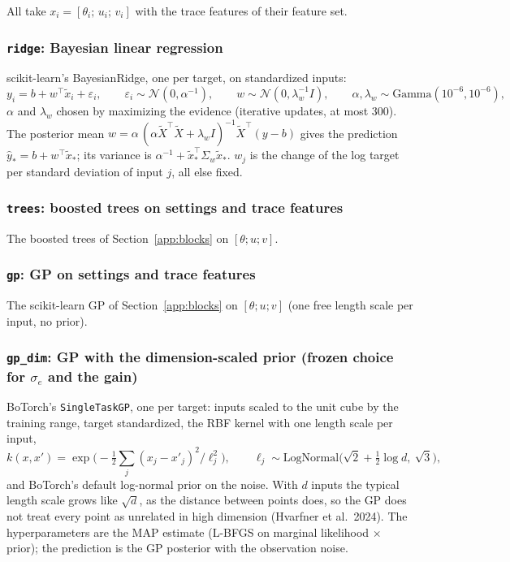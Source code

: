 All take $x_i=[\theta_i;\,u_i;\,v_i]$ with the trace features of their feature set.

\subsubsection{\texttt{ridge}: Bayesian linear regression}
scikit-learn's BayesianRidge, one per target, on standardized inputs:
\[
y_i=b+w^\top\tilde x_i+\varepsilon_i,\qquad \varepsilon_i\sim\mathcal N(0,\alpha^{-1}),\qquad w\sim\mathcal N(0,\lambda_w^{-1}I),
\qquad \alpha,\lambda_w\sim\text{Gamma}(10^{-6},10^{-6}),
\]
$\alpha$ and $\lambda_w$ chosen by maximizing the evidence (iterative updates, at most 300). The posterior mean
$w=\alpha\,(\alpha\tilde X^\top\tilde X+\lambda_w I)^{-1}\tilde X^\top(y-b)$ gives the prediction $\hat y_*=b+w^\top\tilde
x_*$; its variance is $\alpha^{-1}+\tilde x_*^\top\Sigma_w\tilde x_*$. $w_j$ is the change of the log target per standard
deviation of input $j$, all else fixed.


\subsubsection{\texttt{trees}: boosted trees on settings and trace features}
The boosted trees of Section~\ref{app:blocks} on $[\theta;u;v]$.


\subsubsection{\texttt{gp}: GP on settings and trace features}
The scikit-learn GP of Section~\ref{app:blocks} on $[\theta;u;v]$ (one free length scale per input, no prior).


\subsubsection{\texttt{gp\_dim}: GP with the dimension-scaled prior (frozen choice for $\sigma_e$ and the gain)}
BoTorch's \texttt{SingleTaskGP}, one per target: inputs scaled to the unit cube by the training range, target
standardized, the RBF kernel with one length scale per input,
\[
k(x,x')=\exp\Big(-\tfrac12\textstyle\sum_j(x_j-x'_j)^2/\ell_j^2\Big),\qquad \ell_j\sim\text{LogNormal}\big(\sqrt2+\tfrac12\log d,\ \sqrt3\big),
\]
and BoTorch's default log-normal prior on the noise. With $d$ inputs the typical length scale grows like $\sqrt d$, as
the distance between points does, so the GP does not treat every point as unrelated in high dimension (Hvarfner et
al.\ 2024). The hyperparameters are the MAP estimate (L-BFGS on marginal likelihood $\times$ prior); the prediction is
the GP posterior with the observation noise.


